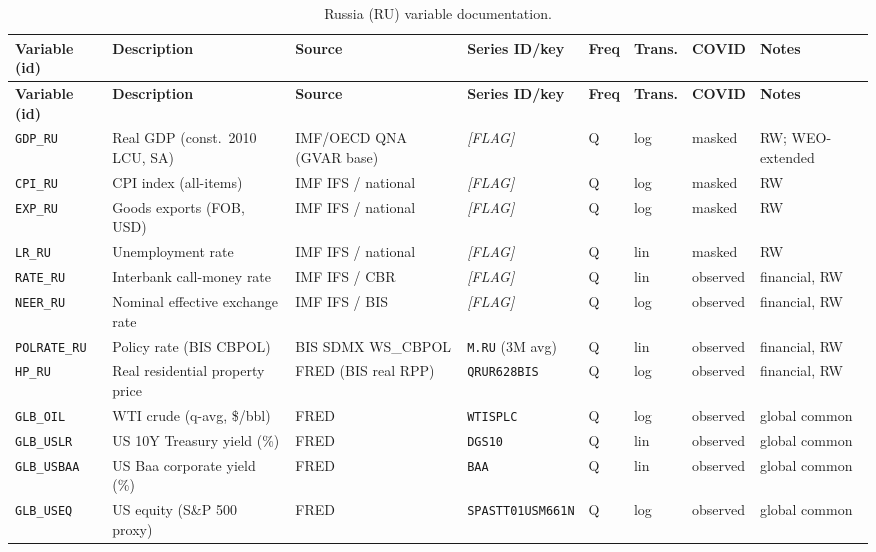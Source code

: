 {\footnotesize
\begin{longtable}{p{2.3cm}p{3.3cm}p{2.1cm}p{2.2cm}p{0.6cm}p{1.4cm}p{1.9cm}p{2.4cm}}
\caption{Russia (RU) variable documentation.}\label{tab:data:RU}\\
\toprule
\textbf{Variable (id)} & \textbf{Description} & \textbf{Source} & \textbf{Series ID/key} & \textbf{Freq} & \textbf{Trans.} & \textbf{COVID} & \textbf{Notes} \\
\midrule
\endfirsthead
\toprule
\textbf{Variable (id)} & \textbf{Description} & \textbf{Source} & \textbf{Series ID/key} & \textbf{Freq} & \textbf{Trans.} & \textbf{COVID} & \textbf{Notes} \\
\midrule
\endhead
\bottomrule
\endfoot
\texttt{GDP\_RU}    & Real GDP (const.\ 2010 LCU, SA)    & IMF/OECD QNA (GVAR base) & \textit{[FLAG]} & Q & log & masked & RW; WEO-extended \\
\texttt{CPI\_RU}    & CPI index (all-items)              & IMF IFS / national & \textit{[FLAG]} & Q & log & masked & RW \\
\texttt{EXP\_RU}    & Goods exports (FOB, USD)           & IMF IFS / national & \textit{[FLAG]} & Q & log & masked & RW \\
\texttt{LR\_RU}     & Unemployment rate                  & IMF IFS / national & \textit{[FLAG]} & Q & lin & masked & RW \\
\texttt{RATE\_RU}   & Interbank call-money rate          & IMF IFS / CBR & \textit{[FLAG]} & Q & lin & observed & financial, RW \\
\texttt{NEER\_RU}   & Nominal effective exchange rate    & IMF IFS / BIS & \textit{[FLAG]} & Q & log & observed & financial, RW \\
\texttt{POLRATE\_RU}& Policy rate (BIS CBPOL)            & BIS SDMX WS\_CBPOL & \texttt{M.RU} (3M avg) & Q & lin & observed & financial, RW \\
\texttt{HP\_RU}     & Real residential property price    & FRED (BIS real RPP) & \texttt{QRUR628BIS} & Q & log & observed & financial, RW \\
\texttt{GLB\_OIL}   & WTI crude (q-avg, \$/bbl)          & FRED & \texttt{WTISPLC} & Q & log & observed & global common \\
\texttt{GLB\_USLR}  & US 10Y Treasury yield (\%)         & FRED & \texttt{DGS10} & Q & lin & observed & global common \\
\texttt{GLB\_USBAA} & US Baa corporate yield (\%)        & FRED & \texttt{BAA} & Q & lin & observed & global common \\
\texttt{GLB\_USEQ}  & US equity (S\&P 500 proxy)         & FRED & \texttt{SPASTT01USM661N} & Q & log & observed & global common \\

\end{longtable}}
